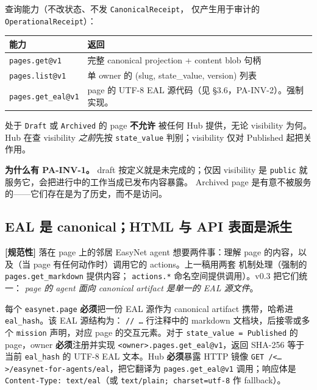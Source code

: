 \documentclass[11pt,a4paper]{article}
\newcommand{\normsv}{\textcolor{normativecolor}{\textbf{[规范性]}}\xspace}
\theoremstyle{definition}
\begin{document}
\noindent 查询能力（不改状态、不发 \texttt{CanonicalReceipt}，
仅产生用于审计的 \texttt{OperationalReceipt}）：

\begin{center}
\renewcommand{\arraystretch}{1.2}
\begin{tabularx}{\linewidth}{l l}
\toprule
\textbf{能力} & \textbf{返回} \\
\midrule
\texttt{pages.get@v1}     & 完整 canonical projection + content blob 句柄 \\
\texttt{pages.list@v1}    & 单 owner 的 (slug, state\_value, version) 列表 \\
\texttt{pages.get\_eal@v1}& page 的 UTF-8 EAL 源代码（见 §3.6，PA-INV-2）。强制实现。 \\
\bottomrule
\end{tabularx}
\end{center}

\begin{invariant}[PA-INV-1]
处于 \texttt{Draft} 或 \texttt{Archived} 的 page \textbf{不允许}
被任何 Hub 提供，无论 visibility 为何。Hub 在查 visibility
\emph{之前}先按 \texttt{state\_value} 判别；visibility 仅对
Published 起把关作用。
\end{invariant}

\textbf{为什么有 PA-INV-1。} draft 按定义就是未完成的；仅因 visibility
是 \texttt{public} 就服务它，会把进行中的工作当成已发布内容暴露。
Archived page 是有意不被服务的——它们存在是为了历史，而不是访问。

\subsection{EAL 是 canonical；HTML 与 API 表面是派生}
\label{sec:eal-canonical-cn}

\normsv{} 落在 page 上的邻居 EasyNet agent 想要两件事：理解 page
的内容，以及（当 page 有任何动作时）调用它的 actions。上一稿用两套
机制处理（强制的 \texttt{pages.get\_markdown} 提供内容；
\texttt{actions.*} 命名空间提供调用）。v0.3 把它们统一：
\emph{page 的 agent 面向 canonical artifact 是单一的 EAL 源文件}。

\begin{invariant}[PA-INV-2]
每个 \texttt{easynet.page} \textbf{必须}把一份 EAL 源作为 canonical
artifact 携带，哈希进 \texttt{eal\_hash}。该 EAL 源结构为：
\texttt{// \ldots} 行注释中的 markdown 文档块，后接零或多个
\texttt{mission} 声明，对应 page 的交互元素。对于 \texttt{state\_value
= Published} 的 page，owner \textbf{必须}注册并实现
\texttt{<owner>.pages.get\_eal@v1}，返回 SHA-256 等于当前
\texttt{eal\_hash} 的 UTF-8 EAL 文本。Hub \textbf{必须}暴露 HTTP
镜像 \texttt{GET /<\ldots>/easynet-for-agents/eal}，把它翻译为
\texttt{pages.get\_eal@v1} 调用；响应体是 \texttt{Content-Type:
text/eal}（或 \texttt{text/plain; charset=utf-8} 作 fallback）。
\end{invariant}
\end{document}
